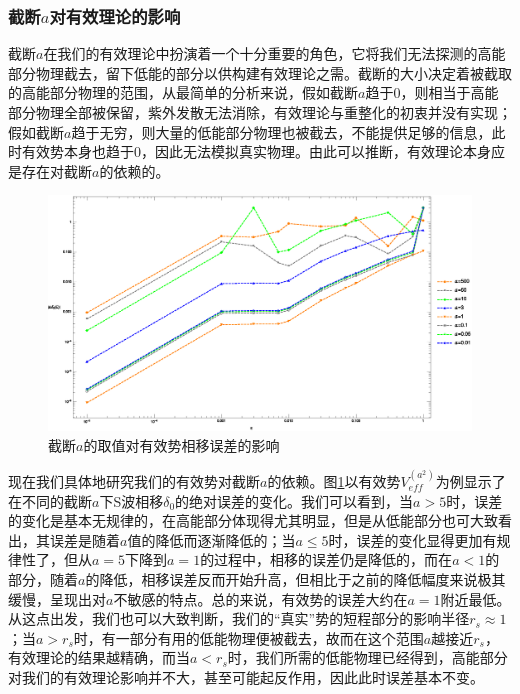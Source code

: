 \documentclass[cs4size,titlepage,twoside]{ctexart}
\begin{document}
\subsubsection{截断$a$对有效理论的影响}
截断$a$在我们的有效理论中扮演着一个十分重要的角色，它将我们无法探测的高能部分物理截去，留下低能的部分以供构建有效理论之需。截断的大小决定着被截取的高能部分物理的范围，从最简单的分析来说，假如截断$a$趋于0，则相当于高能部分物理全部被保留，紫外发散无法消除，有效理论与重整化的初衷并没有实现；假如截断$a$趋于无穷，则大量的低能部分物理也被截去，不能提供足够的信息，此时有效势本身也趋于0，因此无法模拟真实物理。由此可以推断，有效理论本身应是存在对截断$a$的依赖的。
\begin{figure}[!tp]
	\centering
	\includegraphics[width=6in]{Test_PhaseShift_Various_a.eps}
	\caption{截断$a$的取值对有效势相移误差的影响}\label{cutoffa}
\end{figure}

现在我们具体地研究我们的有效势对截断$a$的依赖。图\ref{cutoffa}以有效势$V_{eff}^{(a^2)}$为例显示了在不同的截断$a$下S波相移$\delta_0$的绝对误差的变化。我们可以看到，当$a>5$时，误差的变化是基本无规律的，在高能部分体现得尤其明显，但是从低能部分也可大致看出，其误差是随着$a$值的降低而逐渐降低的；当$a\leq5$时，误差的变化显得更加有规律性了，但从$a=5$下降到$a=1$的过程中，相移的误差仍是降低的，而在$a<1$的部分，随着$a$的降低，相移误差反而开始升高，但相比于之前的降低幅度来说极其缓慢，呈现出对$a$不敏感的特点。总的来说，有效势的误差大约在$a=1$附近最低。从这点出发，我们也可以大致判断，我们的“真实”势的短程部分的影响半径$r_s\approx1$；当$a>r_s$时，有一部分有用的低能物理便被截去，故而在这个范围$a$越接近$r_s$，有效理论的结果越精确，而当$a<r_s$时，我们所需的低能物理已经得到，高能部分对我们的有效理论影响并不大，甚至可能起反作用，因此此时误差基本不变。
\end{document}
